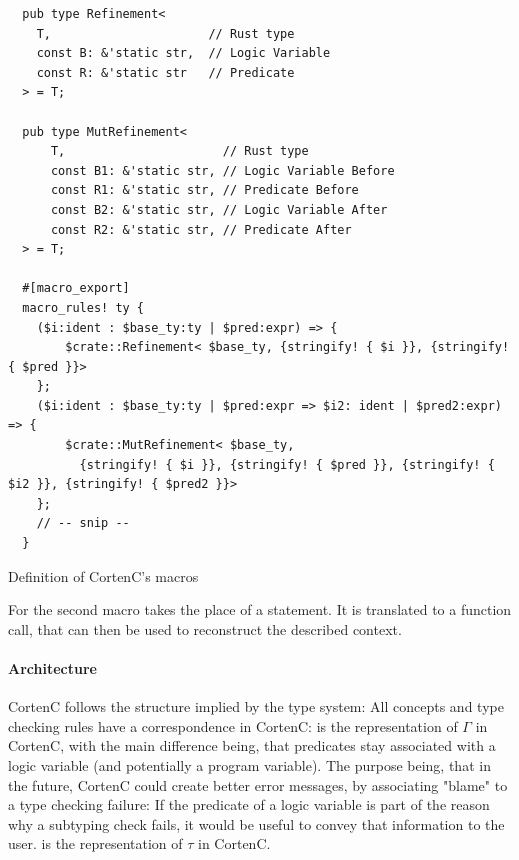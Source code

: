 \documentclass[twoside, english]{sdqthesis}
\theoremstyle{definition}
\begin{document}
\begin{listing}[ht]
  \begin{verbatim}
  pub type Refinement<
    T,                      // Rust type
    const B: &'static str,  // Logic Variable
    const R: &'static str   // Predicate
  > = T;

  pub type MutRefinement<
      T,                      // Rust type
      const B1: &'static str, // Logic Variable Before
      const R1: &'static str, // Predicate Before
      const B2: &'static str, // Logic Variable After
      const R2: &'static str, // Predicate After
  > = T;

  #[macro_export]
  macro_rules! ty {
    ($i:ident : $base_ty:ty | $pred:expr) => {
        $crate::Refinement< $base_ty, {stringify! { $i }}, {stringify! { $pred }}>
    };
    ($i:ident : $base_ty:ty | $pred:expr => $i2: ident | $pred2:expr) => {
        $crate::MutRefinement< $base_ty, 
          {stringify! { $i }}, {stringify! { $pred }}, {stringify! { $i2 }}, {stringify! { $pred2 }}>
    };
    // -- snip --
  }
  \end{verbatim}
  \caption{Definition of CortenC's macros}
  \label{lst:macro-definition}
\end{listing}

For the second macro  takes the place of a statement. 
It is translated to a function call, that can then be used to reconstruct the described context.

\paragraph{Architecture}
CortenC follows the structure implied by the type system: All concepts and type checking rules have a correspondence in CortenC:
 is the representation of $\Gamma$ in CortenC, with the main difference being, that predicates stay associated with a logic variable (and potentially a program variable). The purpose being, that in the future, CortenC could create better error messages, by associating "blame" to a type checking failure: If the predicate of a logic variable is part of the reason why a subtyping check fails, it would be useful to convey that information to the user. 
 is the representation of $\tau$ in CortenC.
\end{document}
